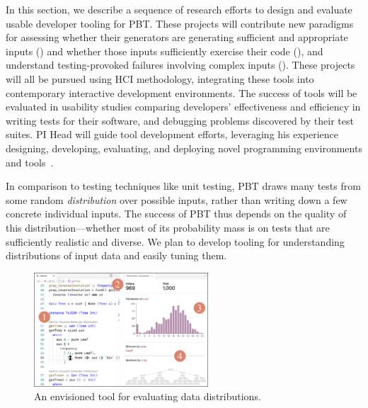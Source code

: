 In this section, we
describe a sequence of research efforts to design and evaluate usable developer
tooling for PBT. These projects will contribute new paradigms for assessing whether their generators are generating sufficient and
appropriate inputs () and whether those
inputs sufficiently exercise their code (),
and understand testing-provoked failures involving complex inputs
().
%
%
%
These projects will all be pursued using HCI
methodology, integrating these tools into contemporary interactive development
environments. The success of tools will be evaluated in usability studies
comparing developers' effectiveness and efficiency in writing tests for their
software, and debugging problems discovered by their test suites.  PI Head will
guide tool development efforts, leveraging his
experience designing, developing, evaluating, and deploying novel programming
environments and
tools~\cite{ref:head2015tutorons,ref:suzuki2017tracediff,ref:head2017writing,ref:head2018when,ref:head2018interactive,ref:head2019managing,ref:head2020composing}.

%
In comparison to testing techniques like unit testing, PBT draws many
tests from some
random {\em distribution} over possible inputs, rather than writing down a few
concrete individual inputs. The success  of
PBT thus depends on the quality of this distribution---whether
most of its probability mass is on tests that are sufficiently
realistic and diverse. We plan
to develop tooling for
understanding distributions of input data and easily tuning them.

\begin{figure}
  \centering
  \includegraphics[width=0.58\textwidth]{assets/gen-vis.pdf}
  \caption{An envisioned tool for evaluating data distributions.
    }\label{fig:gen-vis}
\end{figure}


